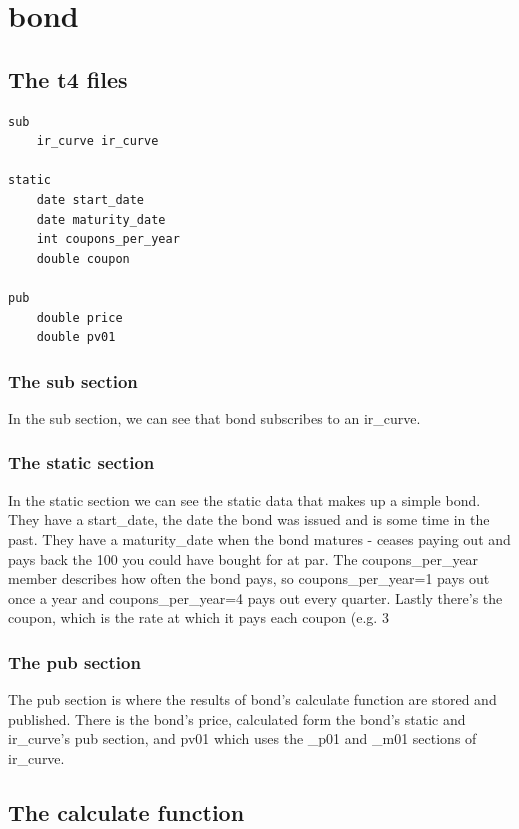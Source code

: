 \documentclass{report}
\begin{document}
\section{bond}

\subsection{The t4 files}

\begin{verbatim}
sub
    ir_curve ir_curve

static
    date start_date
    date maturity_date
    int coupons_per_year
    double coupon

pub
    double price
    double pv01
\end{verbatim}

\subsubsection{The sub section}

In the sub section, we can see that bond subscribes to an ir_curve.

\subsubsection{The static section}

In the static section we can see the static data that makes up a simple bond. They have a start_date, the date the bond was issued and is some time in the past. They have a maturity_date when the bond matures - ceases paying out and pays back the 100 you could have bought for at par. The coupons_per_year member describes how often the bond pays, so coupons_per_year=1 pays out once a year and coupons_per_year=4 pays out every quarter. Lastly there's the coupon, which is the rate at which it pays each coupon (e.g. 3%

\subsubsection{The pub section}

The pub section is where the results of bond's calculate function are stored and published. There is the bond's price, calculated form the bond's static and ir_curve's pub section, and pv01 which uses the _p01 and _m01 sections of ir_curve.

\subsection{The calculate function}
\end{document}
